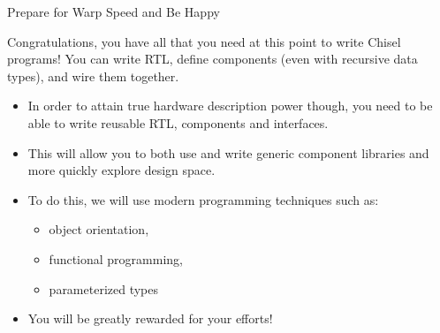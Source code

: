 \documentclass[xcolor=pdflatex,dvipsnames,table]{beamer}
\begin{document}
\begin{frame}{Prepare for Warp Speed and Be Happy}

Congratulations, you have all that you need at this point to write Chisel programs!
You can write RTL, define components (even with recursive data types), and wire them together.
\vspace{5mm}
\begin{itemize}
\item In order to attain true hardware description power though, you need to be able to write reusable RTL, components and interfaces.
\item This will allow you to both use and write generic component libraries and more quickly explore design space.
\item To do this, we will use modern programming techniques such as:
\begin{itemize}
\item object orientation, 
\item functional programming, 
\item parameterized types
\end{itemize}
\item You will be greatly rewarded for your efforts!
\end{itemize}

\end{frame}
\end{document}
